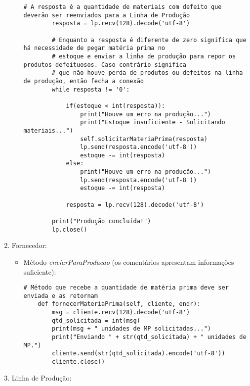 \documentclass[brazil, a4paper,12pt]{article}
\begin{document}
\begin{enumerate}
\begin{itemize}
\begin{lstlisting}[style=sd]
        # A resposta é a quantidade de materiais com defeito que deverão ser reenviados para a Linha de Produção
        resposta = lp.recv(128).decode('utf-8')

        # Enquanto a resposta é diferente de zero significa que há necessidade de pegar matéria prima no
        # estoque e enviar a linha de produção para repor os produtos defeituosos. Caso contrário significa
        # que não houve perda de produtos ou defeitos na linha de produção, então fecha a conexão
        while resposta != '0':

            if(estoque < int(resposta)):
                print("Houve um erro na produção...")
                print("Estoque insuficiente - Solicitando materiais...")
                self.solicitarMateriaPrima(resposta)
                lp.send(resposta.encode('utf-8'))
                estoque -= int(resposta)
            else:
                print("Houve um erro na produção...")
                lp.send(resposta.encode('utf-8'))
                estoque -= int(resposta)

            resposta = lp.recv(128).decode('utf-8')

        print("Produção concluída!")
        lp.close()

\end{lstlisting}

\end{itemize}

\item Fornecedor:

\begin{itemize}

\item Método \emph{enviarParaProducao} (os comentários apresentam informações suficiente):

\begin{lstlisting}[style=sd]
# Método que recebe a quantidade de matéria prima deve ser enviada e as retornam
    def fornecerMateriaPrima(self, cliente, endr):
        msg = cliente.recv(128).decode('utf-8')
        qtd_solicitada = int(msg)
        print(msg + " unidades de MP solicitadas...")
        print("Enviando " + str(qtd_solicitada) + " unidades de MP.")
        cliente.send(str(qtd_solicitada).encode('utf-8'))
        cliente.close()

\end{lstlisting}

\end{itemize}

\item Linha de Produção:


\end{enumerate}
\end{document}
